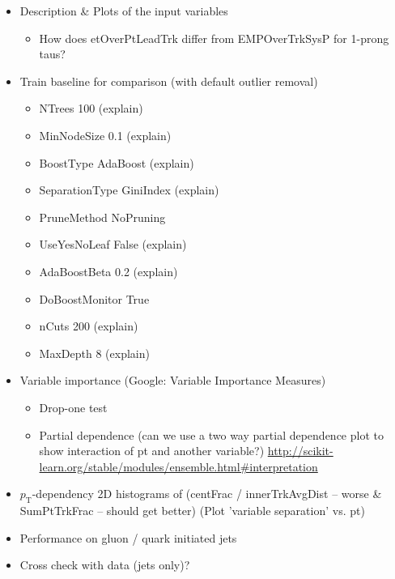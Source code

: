 \begin{itemize}
\item Description \& Plots of the input variables
  \begin{itemize}
  \item How does etOverPtLeadTrk differ from EMPOverTrkSysP for 1-prong taus?
  \end{itemize}

\item Train baseline for comparison (with default outlier removal)
  \begin{itemize}
  \item NTrees 100 (explain)
  \item MinNodeSize 0.1 (explain)
  \item BoostType AdaBoost (explain)
  \item SeparationType GiniIndex (explain)
  \item PruneMethod NoPruning
  \item UseYesNoLeaf False (explain)
  \item AdaBoostBeta 0.2 (explain)
  \item DoBoostMonitor True
  \item nCuts 200 (explain)
  \item MaxDepth 8 (explain)
  \end{itemize}

\item Variable importance (Google: Variable Importance Measures)
  \begin{itemize}
  \item Drop-one test
  \item Partial dependence (can we use a two way partial dependence plot to
    show interaction of pt and another variable?)
    \url{http://scikit-learn.org/stable/modules/ensemble.html#interpretation}
  \end{itemize}

\item $p_\mathrm{T}$-dependency 2D histograms of (centFrac / innerTrkAvgDist --
  worse \& SumPtTrkFrac -- should get better) (Plot 'variable separation' vs.
  pt)

\item Performance on gluon / quark initiated jets

\item Cross check with data (jets only)?

\end{itemize}

